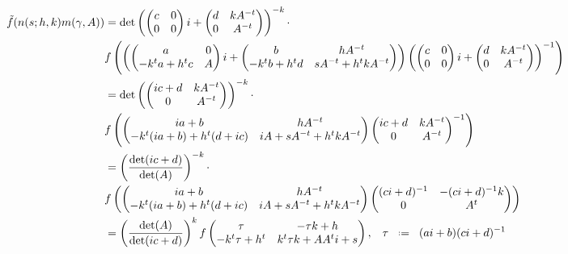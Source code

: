\begin{align*}
    \tilde{f}(n(s; h, k) m(\gamma, A) ) &= \det\left(\begin{pmatrix}
    c & 0 \\
    0 & 0
\end{pmatrix}i+ \begin{pmatrix}
    d & kA^{-t} \\
    0 & A^{-t}
\end{pmatrix} \right)^{-k} \cdot \\
&f\left(         \left(\begin{pmatrix}
    a & 0\\
    -k^ta + h^tc & A
\end{pmatrix}i+\begin{pmatrix}
    b & hA^{-t} \\
    -k^tb + h^td & sA^{-t} + h^tkA^{-t}
\end{pmatrix}\right)   \left(\begin{pmatrix}
    c & 0 \\
    0 & 0
\end{pmatrix}i+ \begin{pmatrix}
    d & kA^{-t} \\
    0 & A^{-t}
\end{pmatrix} \right)\inv      \right) \\
&= \det\left( \begin{pmatrix}
    ic + d & kA^{-t} \\
    0 & A^{-t}
\end{pmatrix}\right)^{-k} \cdot \\
&f\left( \begin{pmatrix}
    ia + b &  hA^{-t}\\
    -k^t(ia +b) + h^t(d + ic) & iA + sA^{-t} + h^tkA^{-t}
\end{pmatrix}  \begin{pmatrix}
    ic + d & kA^{-t} \\
    0 & A^{-t}
\end{pmatrix}\inv      \right) \\
&=\left(\frac{\det(ic + d)}{\det(A)}\right)^{-k} \cdot \\ &f\left( \begin{pmatrix}
    ia + b &  hA^{-t}\\
    -k^t(ia +b) + h^t(d + ic) & iA + sA^{-t} + h^tkA^{-t}
\end{pmatrix}   \begin{pmatrix}(ci+d)^{-1} & -(ci+d)^{-1} k\\ 0 & A^t \end{pmatrix} \right) \\
&= \left(\frac{\det(A)}{\det(ic + d)}\right)^{k} f\begin{pmatrix} \tau & -\tau k + h\\ -k^t \tau + h^t & k^t \tau k + A A^t i + s \end{pmatrix}, \;\;\; \tau \defeq (ai+b)(ci + d)\inv \\
\end{align*} 
